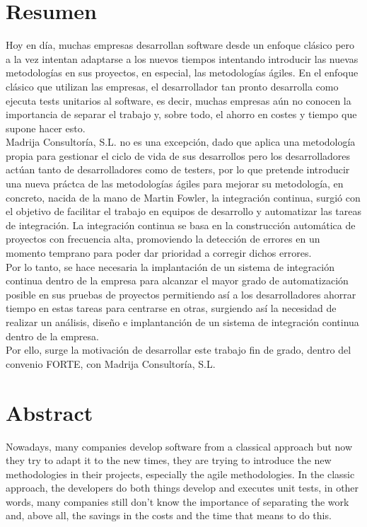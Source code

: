 \chapter{Resumen}

Hoy en día, muchas empresas desarrollan software desde un enfoque clásico pero a la vez intentan adaptarse a los nuevos tiempos intentando introducir las nuevas metodologías en sus proyectos, en especial, las metodologías ágiles. En el enfoque clásico que utilizan las empresas, el desarrollador tan pronto desarrolla como ejecuta tests unitarios al software, es decir, muchas empresas aún no conocen la importancia de separar el trabajo y, sobre todo, el ahorro en costes y tiempo que supone hacer esto.\\

Madrija Consultoría, S.L. no es una excepción, dado que aplica una metodología propia para gestionar el ciclo de vida de sus desarrollos pero los desarrolladores actúan tanto de desarrolladores como de testers, por lo que pretende introducir una nueva práctca de las metodologías ágiles para mejorar su metodología, en concreto, nacida de la mano de Martin Fowler, la integración continua, surgió con el objetivo de facilitar el trabajo en equipos de desarrollo y automatizar las tareas de integración. La integración continua se basa en la construcción automática de proyectos con frecuencia alta, promoviendo la detección de errores en un momento temprano para poder dar prioridad a corregir dichos errores.\\

Por lo tanto, se hace necesaria la implantación de un sistema de integración continua dentro de la empresa para alcanzar el mayor grado de automatización posible en sus pruebas de proyectos permitiendo así a los desarrolladores ahorrar tiempo en estas tareas para centrarse en otras, surgiendo así la necesidad de realizar un análisis, diseño e implantanción de un sistema de integración continua dentro de la empresa.\\

Por ello, surge la motivación de desarrollar este trabajo fin de grado, dentro del convenio FORTE, con  Madrija Consultoría, S.L.\\

\chapter{Abstract}

Nowadays, many companies develop software from a classical approach but now they try to adapt it to the new times, they are trying to introduce the new methodologies in their projects, especially the agile methodologies. In the classic approach, the developers do both things develop and executes unit tests, in other words, many companies still don't know the importance of separating the work and, above all, the savings in the costs and the time that means to do this.\\

